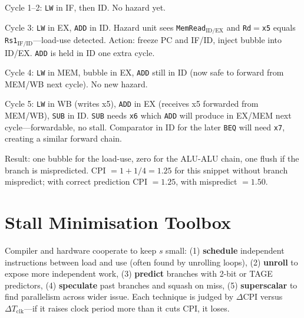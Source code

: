 Cycle 1--2: \texttt{LW} in IF, then ID. No hazard yet.

Cycle 3: \texttt{LW} in EX, \texttt{ADD} in ID. Hazard unit sees \texttt{MemRead$_{\text{ID/EX}}$} and \texttt{Rd$=$x5} equals \texttt{Rs1$_{\text{IF/ID}}$}---load-use detected. Action: freeze PC and IF/ID, inject bubble into ID/EX. \texttt{ADD} is held in ID one extra cycle.

Cycle 4: \texttt{LW} in MEM, bubble in EX, \texttt{ADD} still in ID (now safe to forward from MEM/WB next cycle). No new hazard.

Cycle 5: \texttt{LW} in WB (writes x5), \texttt{ADD} in EX (receives x5 forwarded from MEM/WB), \texttt{SUB} in ID. \texttt{SUB} needs \texttt{x6} which \texttt{ADD} will produce in EX/MEM next cycle---forwardable, no stall. Comparator in ID for the later \texttt{BEQ} will need \texttt{x7}, creating a similar forward chain.

Result: one bubble for the load-use, zero for the ALU-ALU chain, one flush if the branch is mispredicted. CPI $=1+1/4=1.25$ for this snippet without branch mispredict; with correct prediction CPI $=1.25$, with mispredict $=1.50$.

\begin{center}
\end{center}

\section{Stall Minimisation Toolbox}
Compiler and hardware cooperate to keep $s$ small: (1) \textbf{schedule} independent instructions between load and use (often found by unrolling loops), (2) \textbf{unroll} to expose more independent work, (3) \textbf{predict} branches with 2-bit or TAGE predictors, (4) \textbf{speculate} past branches and squash on miss, (5) \textbf{superscalar} to find parallelism across wider issue. Each technique is judged by $\Delta\text{CPI}$ versus $\Delta T_{\text{clk}}$---if it raises clock period more than it cuts CPI, it loses.

